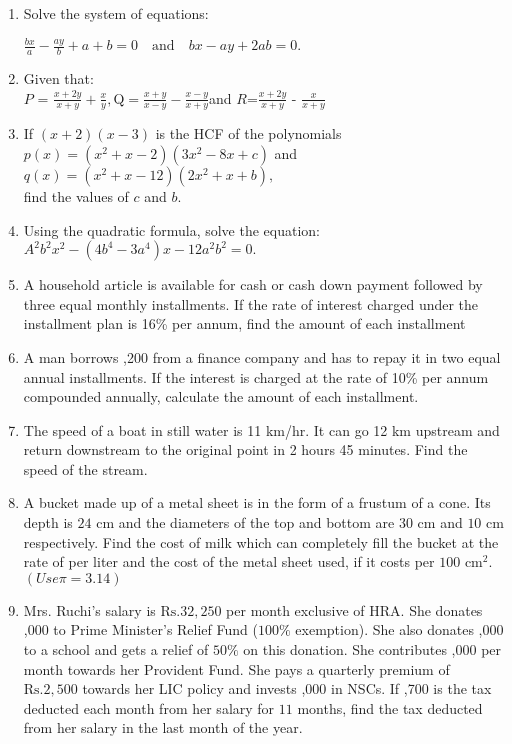 \begin{enumerate}
\item \textbf{}Solve the system of equations:

$\frac{bx}{a} - \frac{a y}{b} + a + b = 0 \quad \text{and} \quad b x - a y + 2ab = 0.$

\item Given that:\\

$P$ = $\frac{x+2y}{x+y} + \frac{x}{y}, $Q$=\frac{x+y}{x-y}-\frac{x-y}{x+y}$\quad and $R$=$\frac{x+2y}{x+y}$ - $\frac{x}{x+y}$  \\

\item If $(x + 2)(x - 3)$ is the HCF of the polynomials $p(x) = (x^2 + x - 2)(3x^2 - 8x + c)$ and $q(x) = (x^2 + x - 12)(2x^2 + x + b),$ \\
find the values of $c$ and $b$.

\item  Using the quadratic formula, solve the equation: $A^2 b^2 x^2 - (4b^4 - 3a^4) x - 12 a^2 b^2 = 0.$

\item  A household article is available for  cash or  cash down payment followed by three equal monthly installments. If the rate of interest charged under the installment plan is 16\% per annum, find the amount of each installment \\

\item A man borrows ,200 from a finance company and has to repay it in two equal annual installments. If the interest is charged at the rate of 10\% per annum compounded annually, calculate the amount of each installment.

\item The speed of a boat in still water is 11 km/hr. It can go 12 km upstream and return 
downstream to the original point in 2 hours 45 minutes. Find the speed of the stream.

\item A bucket made up of a metal sheet is in the form of a frustum of a cone. Its depth is $24\text{ cm}$ and the diameters of the top and bottom are $30\text{ cm}$ and $10\text{ cm}$ respectively. Find the cost of milk which can completely fill the bucket at the rate of  per liter and the cost of the metal sheet used, if it costs  per $100\text{ cm}^2$. $(Use \pi=3.14)$


\item Mrs. Ruchi's salary is $\text{Rs.} 32,250$ per month exclusive of HRA. She donates ,000 to Prime Minister's Relief Fund ($100\%$ exemption). She also donates ,000 to a school and gets a relief of $50\%$ on this donation. She contributes ,000 per month towards her Provident Fund. She pays a quarterly premium of $\text{Rs.} 2,500$ towards her LIC policy and invests ,000 in NSCs. If ,700 is the tax deducted each month from her salary for $11$ months, find the tax deducted from her salary in the last month of the year.


\end{enumerate}
